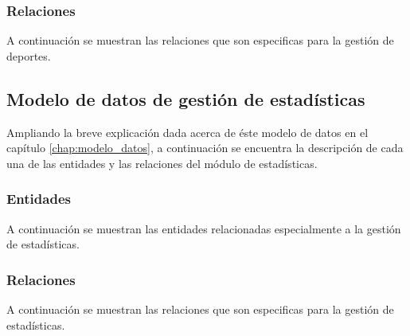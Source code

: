 \subsubsection{Relaciones}
A continuación se muestran las relaciones que son especificas para la gestión de deportes.

\clearpage













\subsection{Modelo de datos de gestión de estadísticas}
Ampliando la breve explicación dada acerca de éste modelo de datos en el capítulo \ref{chap:modelo_datos}, a continuación se encuentra la descripción de cada una de las entidades y las relaciones del módulo de estadísticas.

\subsubsection{Entidades}
A continuación se muestran las entidades relacionadas especialmente a la gestión de estadísticas.

\clearpage
%

\subsubsection{Relaciones}
A continuación se muestran las relaciones que son especificas para la gestión de estadísticas.

\clearpage
%